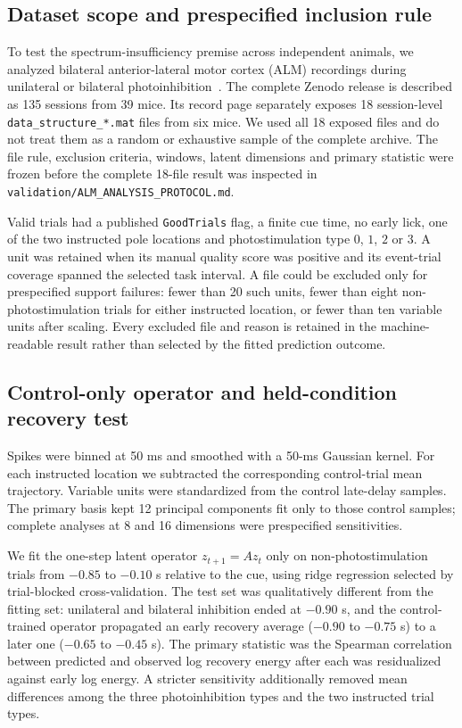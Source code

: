 \documentclass[
  aps,prl,preprint,notitlepage,superscriptaddress,nofootinbib,longbibliography,
  amsmath,amssymb
]{revtex4-2}
\begin{document}
\subsection{Dataset scope and prespecified inclusion rule}

To test the spectrum-insufficiency premise across independent animals, we
analyzed bilateral anterior-lateral motor cortex (ALM) recordings
during unilateral or bilateral photoinhibition~\cite{chen2021modularity,chenli2022dataset}.
The complete Zenodo release is described as 135 sessions from 39 mice.  Its
record page separately exposes 18 session-level
\texttt{data\_structure\_*.mat} files from six mice.  We used all 18 exposed
files and do not treat them as a random or exhaustive sample of the complete
archive.  The file rule, exclusion criteria, windows, latent dimensions and
primary statistic were frozen before the complete 18-file result was inspected
in \texttt{validation/ALM\_ANALYSIS\_PROTOCOL.md}.

Valid trials had a published \texttt{GoodTrials} flag, a finite cue time, no
early lick, one of the two instructed pole locations and photostimulation type
$0$, $1$, $2$ or $3$.  A unit was retained when its manual quality score was
positive and its event-trial coverage spanned the selected task interval.  A
file could be excluded only for prespecified support failures: fewer than 20
such units, fewer than eight non-photostimulation trials for either instructed
location, or fewer than ten variable units after scaling.  Every excluded file
and reason is retained in the machine-readable result rather than selected by
the fitted prediction outcome.

\subsection{Control-only operator and held-condition recovery test}

Spikes were binned at 50 ms and smoothed with a 50-ms Gaussian kernel.  For
each instructed location we subtracted the corresponding control-trial mean
trajectory.  Variable units were standardized from the
control late-delay samples.  The primary basis kept 12 principal components
fit only to those control samples; complete analyses at 8 and 16 dimensions
were prespecified sensitivities.

We fit the one-step latent operator $z_{t+1}=Az_t$ only on
non-photostimulation trials from $-0.85$ to $-0.10$ s relative to the cue,
using ridge regression selected by trial-blocked cross-validation.  The test
set was qualitatively different from the fitting set: unilateral and bilateral
inhibition ended at $-0.90$ s, and the control-trained operator propagated an
early recovery average ($-0.90$ to $-0.75$ s) to a later one
($-0.65$ to $-0.45$ s).  The primary statistic was the Spearman
correlation between predicted and observed log recovery energy after each was
residualized against early log energy.  A stricter sensitivity additionally
removed mean differences among the three photoinhibition types and the two
instructed trial types.
\end{document}
